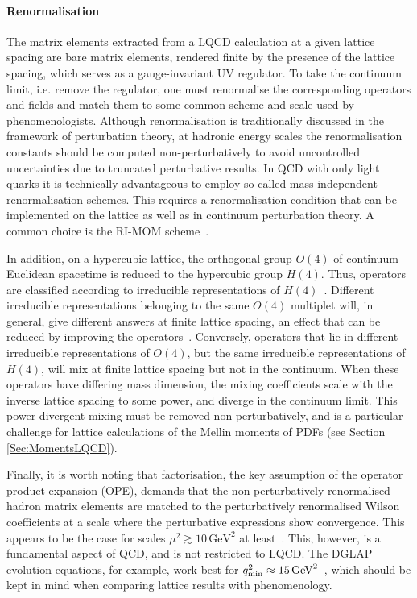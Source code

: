 \paragraph{Renormalisation} The matrix elements extracted from a 
LQCD calculation at a given lattice spacing are bare matrix elements,
rendered finite by the presence of the lattice spacing, which serves
as a gauge-invariant UV regulator. To take the continuum limit,
i.e. remove the regulator, one must renormalise the corresponding
operators and fields and match them to some common scheme and scale used 
by phenomenologists. Although renormalisation is traditionally
discussed in the framework of perturbation theory, at hadronic energy
scales the renormalisation constants should be computed
non-perturbatively to avoid uncontrolled uncertainties due to 
truncated perturbative results. In QCD with only light quarks it is technically
advantageous to employ so-called mass-independent renormalisation
schemes. This requires a renormalisation condition that can be
implemented on the lattice as well as in continuum perturbation
theory. A common choice is the RI-MOM scheme~\cite{Martinelli:1994ty}.

In addition, on a hypercubic lattice, the orthogonal group $O(4)$ of
continuum Euclidean spacetime is reduced to the hypercubic group
$H(4)$. Thus, operators are classified according to irreducible
representations of $H(4)$~\cite{Gockeler:1996mu}. Different
irreducible representations belonging to the same $O(4)$ multiplet
will, in general, give different answers at finite lattice spacing, an
effect that can be reduced by improving the
operators~\cite{Gockeler:2004wp}. Conversely, operators that lie in
different irreducible representations of $O(4)$, but the same irreducible
representations of $H(4)$, will mix at finite lattice spacing but not
in the continuum. When these operators have differing mass dimension,
the mixing coefficients scale with the inverse lattice spacing to some
power, and diverge in the continuum limit. This power-divergent mixing
must be removed non-perturbatively, and is a particular challenge for
lattice calculations of the Mellin moments of PDFs (see
Section \ref{Sec:MomentsLQCD}).

Finally, it is worth noting that factorisation, the key assumption of
the operator product expansion (OPE), demands that the
non-perturbatively renormalised hadron matrix elements are matched to the
perturbatively renormalised Wilson coefficients at a scale where the perturbative 
expressions show convergence. This appears to be
the case for scales $\mu^2 \gtrsim 10 \, \mbox{GeV}^2$ at
least~\cite{Gockeler:2010yr}. This, however, is a fundamental aspect
of QCD, and is not restricted to LQCD. The DGLAP evolution equations,
for example, work best for $q^2_{\rm min} \approx
15 \, \mbox{GeV}^2$~\cite{Abramowicz:2015mha}, which should be kept in
mind when comparing lattice results with phenomenology.

